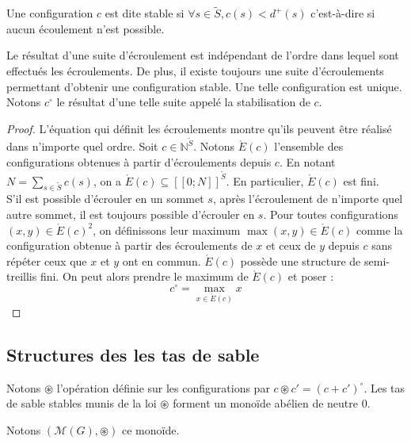 \begin{definition}[Stabilité]
Une configuration $c$ est dite stable si
$\forall s \in \widetilde{S}, c(s) < d^+(s)$
c'est-à-dire si aucun écoulement n'est possible.
\end{definition}

\begin{proposition}
Le résultat d'une suite d'écroulement est indépendant de l'ordre
dans lequel sont effectués les écroulements.
De plus, il existe toujours une suite
d'écroulements permettant d'obtenir une configuration stable.
Une telle configuration est unique. \\
Notons $c^\circ$ le résultat d'une telle suite appelé la stabilisation de $c$.
\end{proposition}

\begin{proof}
L'équation qui définit les écroulements montre qu'ils peuvent être réalisé dans
n'importe quel ordre.
Soit $c \in \mathbb{N}^{\widetilde{S}}$. Notons $\acute{E}(c)$ l'ensemble des
configurations obtenues à partir d'écroulements depuis $c$.
En notant $N = \sum_{s \in \widetilde{S}} c(s)$, on a $\acute{E}(c) \subseteq
[\![0;N]\!]^{\widetilde{S}}$. En particulier, $\acute{E}(c)$ est fini. \\
S'il est possible d'écrouler en un sommet $s$, après l'écroulement de n'importe
quel autre sommet, il est toujours possible d'écrouler en $s$.
Pour toutes configurations $(x, y) \in \acute{E}(c)^2$, on définissons leur
maximum $\max(x, y) \in \acute{E}(c)$ comme la configuration obtenue à partir
des écroulements de $x$ et ceux de $y$ depuis $c$ sans répéter ceux que $x$ et
$y$ ont en commun. $\acute{E}(c)$ possède une structure de semi-treillis fini.
On peut alors prendre le maximum de $\acute{E}(c)$ et poser :
$$
c^\circ = \max_{x \in \acute{E}(c)} x
$$
\end{proof}

\subsection{Structures des les tas de sable}

\begin{definition}
Notons $\circledast$ l'opération définie sur les configurations
par $c \circledast c' = (c + c')^\circ$.
Les tas de sable stables munis de la loi $\circledast$ forment un monoïde abélien de neutre $0$.

Notons $\left(\mathcal{M}(G), \circledast\right)$ ce monoïde.
\end{definition}

